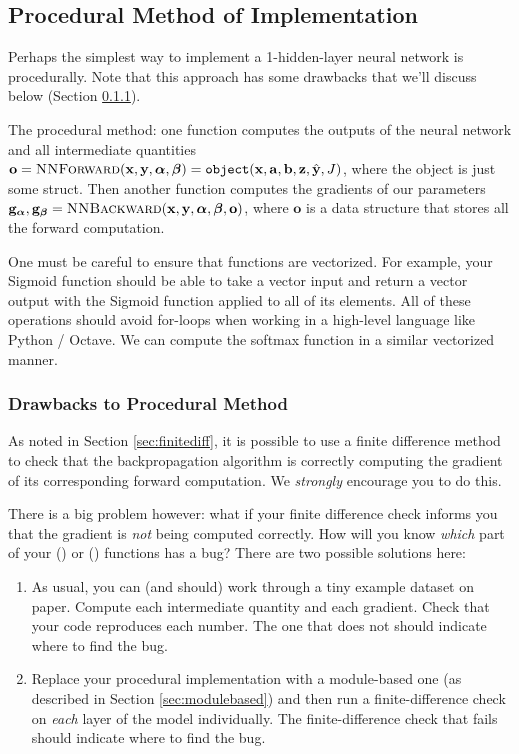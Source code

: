 \documentclass[11pt]{article}
\numberwithin{equation}{section} %
\numberwithin{figure}{section} %
\numberwithin{table}{section} %
\newcommand{\av}{\mathbf{a}}
\newcommand{\bv}{\mathbf{b}}
\newcommand{\gv}{\mathbf{g}}
\newcommand{\ov}{\mathbf{o}}
\newcommand{\xv}{\mathbf{x}}
\newcommand{\yv}{\mathbf{y}}
\newcommand{\zv}{\mathbf{z}}
\newcommand{\alphav     }{\boldsymbol \alpha     }
\newcommand{\betav      }{\boldsymbol \beta      }
\begin{document}
\subsection{Procedural Method of Implementation}
\label{sec:procedural}

Perhaps the simplest way to implement a 1-hidden-layer neural network is procedurally. Note that this approach has some drawbacks that we'll discuss below (Section \ref{sec:proceduraldrawbacks}). 

The procedural method: one function computes the outputs of the neural network and all intermediate quantities $\ov = \textproc{NNForward}(\xv, \yv, \alphav, \betav) = \texttt{object}( \xv, \av, \bv, \zv, \hat{\yv}, J)$, where the object is just some struct. Then another function computes the gradients of our parameters $\gv_{\alphav}, \gv_{\betav} = \textproc{NNBackward}(\xv, \yv, \alphav, \betav, \ov)$, where $\ov$ is a data structure that stores all the forward computation.

One must be careful to ensure that functions are vectorized. For example, your Sigmoid function should be able to take a vector input and return a vector output with the Sigmoid function applied to all of its elements. All of these operations should avoid for-loops when working in a high-level language like Python / Octave. We can compute the softmax function in a similar vectorized manner.

\subsubsection{Drawbacks to Procedural Method}
\label{sec:proceduraldrawbacks}

As noted in Section \ref{sec:finitediff}, it is possible to use a finite difference method to check that the backpropagation algorithm is correctly computing the gradient of its corresponding forward computation. We \emph{strongly} encourage you to do this.

There is a big problem however: what if your finite difference check informs you that the gradient is \emph{not} being computed correctly. How will you know \emph{which} part of your () or () functions has a bug? There are two possible solutions here:
\begin{enumerate}
    \item As usual, you can (and should) work through a tiny example dataset on paper. Compute each intermediate quantity and each gradient. Check that your code reproduces each number. The one that does not should indicate where to find the bug.
    \item Replace your procedural implementation with a module-based one (as described in Section \ref{sec:modulebased}) and then run a finite-difference check on \emph{each} layer of the model individually. The finite-difference check that fails should indicate where to find the bug.
\end{enumerate}
\end{document}
